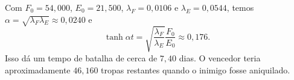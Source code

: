 Com $F_{0}=54{,}000$, $E_{0}=21{,}500$, $\lambda_{F}=0{,}0106$ e $\lambda_{E}=0{,}0544$, temos $\alpha=\sqrt{\lambda_{F}\lambda_{E}}\approx0{,}0240$ e
\[
\tanh\alpha t = \sqrt{\frac{\lambda_{F}}{\lambda_{E}}}\frac{F_{0}}{E_{0}}\approx0{,}176.
\]
Isso dá um tempo de batalha de cerca de $7{,}40$ dias. O vencedor teria aproximadamente $46{,}160$ tropas restantes quando o inimigo fosse aniquilado. 
